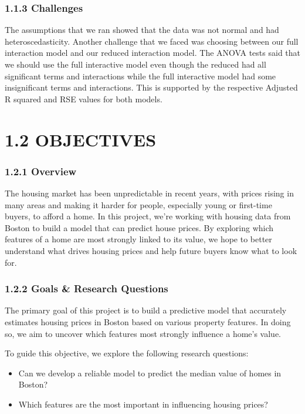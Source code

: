 \documentclass[
]{article}
\providecommand{\tightlist}{%
  \setlength{\itemsep}{0pt}\setlength{\parskip}{0pt}}
\begin{document}
\subsubsection{1.1.3 Challenges}\label{challenges}

The assumptions that we ran showed that the data was not normal and had
heteroscedasticity. Another challenge that we faced was choosing between
our full interaction model and our reduced interaction model. The ANOVA
tests said that we should use the full interactive model even though the
reduced had all significant terms and interactions while the full
interactive model had some insignificant terms and interactions. This is
supported by the respective Adjusted R squared and RSE values for both
models.

\hfill\break
\hfill\break

\section{1.2 OBJECTIVES}\label{objectives}

\subsubsection{1.2.1 Overview}\label{overview}

The housing market has been unpredictable in recent years, with prices
rising in many areas and making it harder for people, especially young
or first-time buyers, to afford a home. In this project, we're working
with housing data from Boston to build a model that can predict house
prices. By exploring which features of a home are most strongly linked
to its value, we hope to better understand what drives housing prices
and help future buyers know what to look for.

\subsubsection{1.2.2 Goals \& Research
Questions}\label{goals-research-questions}

The primary goal of this project is to build a predictive model that
accurately estimates housing prices in Boston based on various property
features. In doing so, we aim to uncover which features most strongly
influence a home's value.

To guide this objective, we explore the following research questions:

\begin{itemize}
\tightlist
\item
  Can we develop a reliable model to predict the median value of homes
  in Boston?\\
\item
  Which features are the most important in influencing housing prices?
\end{itemize}
\end{document}
